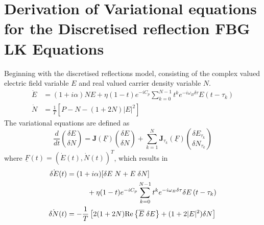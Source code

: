 \section{Derivation of Variational equations for the Discretised reflection FBG LK Equations}
\label{app:lyapunov}
%
Beginning with the discretised reflections model, consisting of the complex valued electric field variable $E$ and real valued carrier density variable $N$. 
\begin{align*}
\dot{E}&=(1+i \alpha) N E+\eta(1-t) e^{-i C_p} \sum_{k=0}^{N-1} t^{k} e^{-i \omega_B \delta \tau} E\left(t-\tau_k \right) \\
\dot{N}&=\frac{1}{T}\left[P-N-(1+2 N)|E|^{2}\right]
\end{align*}
%
The variational equations are defined as
%
\begin{equation}
    \frac{d}{d t}\binom{\delta E}{\delta N} = \mathbf{J}(\underline{F})\binom{\delta E}{\delta N} + \sum_{k=1}^{N}\mathbf{J}_{\tau_{k}}(\underline{F})\binom{\delta E_{\tau_{k}}}{\delta N_{\tau_{k}}}
\end{equation}
%
where $\underline{F}(t)=(\dot{E}(t), \dot{N}(t))^T$, which results in
%
\begin{gather}
\begin{aligned}
    \label{eq:variational}
    \dot{\delta E}(t) &= (1+i \alpha)[\delta E \; N + E \; \delta N]\\
                &\hspace{1cm} + \eta(1-t) e^{-i C_p} \sum_{k=0}^{N-1} t^{k} e^{-i \omega_B \delta \tau} \delta E\left(t-\tau_{k}\right) \\
    \dot{\delta N}(t) &=-\frac{1}{T}\left[2(1+2 N) \text{Re}\left\{\overline{E} \; \delta E\right\} + (1+2|E|^{2} ) \delta N \right]
\end{aligned}
\end{gather}
